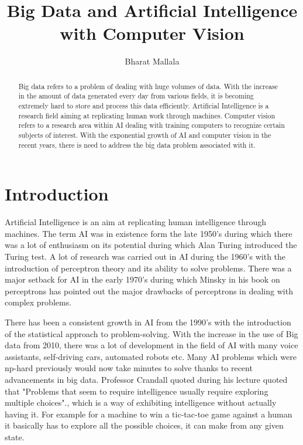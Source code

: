 \documentclass[sigconf]{acmart}
\begin{document}
\title{Big Data and Artificial Intelligence with Computer Vision}

\author{Bharat Mallala}








\begin{abstract}
Big data refers to a problem of dealing with huge volumes of data. With the increase in the amount of data generated every day from various fields, it is becoming extremely hard to store and process this data efficiently. Artificial Intelligence is a research field aiming at replicating human work through machines. Computer vision refers to a research area within AI dealing with training computers to recognize certain subjects of interest. With the exponential growth of AI and computer vision in the recent years, there is need to address the big data problem associated with it.
\end{abstract}



\maketitle

\section{Introduction}
Artificial Intelligence is an aim at replicating human intelligence through machines. The term AI was in existence form the late 1950's during which there was a lot of enthusiasm on its potential during which Alan Turing introduced the Turing test. A lot of research was carried out in AI during the 1960's with the introduction of perceptron theory and its ability to solve problems. There was a major setback for AI in the early 1970's during which Minsky in his book on perceptrons has pointed out the major drawbacks of perceptrons in dealing with complex problems.\cite{Crandall}

There has been a consistent growth in AI from the 1990's with the introduction of the statistical approach to problem-solving. With the increase in the use of Big data from 2010, there was a lot of development in the field of AI with many voice assistants, self-driving cars, automated robots etc. Many AI problems which were np-hard previously would now take minutes to solve thanks to recent advancements in big data. Professor Crandall quoted during his lecture quoted that "Problems that seem to require intelligence usually require exploring multiple choices".\cite{Crandall}, which is a way of exhibiting intelligence without actually having it. For example for a machine to win a tic-tac-toe game against a human it basically has to explore all the possible choices, it can make from any given state.
\end{document}
